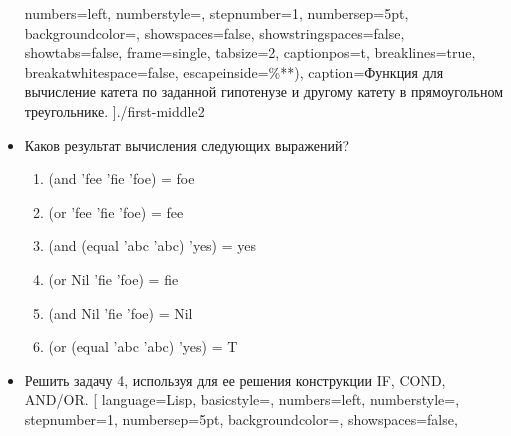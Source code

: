 \begin{itemize}
		numbers=left,               %
		numberstyle=\tiny,           %
		stepnumber=1,                   %
		numbersep=5pt,                %
		backgroundcolor=\color{white}, %
		showspaces=false,            %
		showstringspaces=false,      %
		showtabs=false,             %
		frame=single,              %
		tabsize=2,                 %
		captionpos=t,              %
		breaklines=true,           %
		breakatwhitespace=false, %
		escapeinside={\%*}{*)},  %
		caption=Функция для вычисление катета по заданной гипотенузе и другому катету в прямоугольном треугольнике.
		]{./first-middle2}
	\item Каков результат вычисления следующих выражений?
		\begin{enumerate}
			\item (and 'fee 'fie 'foe) = foe
			\item (or 'fee 'fie 'foe) = fee
			\item (and (equal 'abc 'abc) 'yes) = yes
			\item (or Nil 'fie 'foe) = fie
			\item (and Nil 'fie 'foe) = Nil
			\item (or (equal 'abc 'abc) 'yes) = T
		\end{enumerate}
	\item Решить задачу 4, используя для ее решения конструкции IF, COND, AND/OR.
		[
		language=Lisp,                 %
		basicstyle=\small\sffamily, %
		numbers=left,               %
		numberstyle=\tiny,           %
		stepnumber=1,                   %
		numbersep=5pt,                %
		backgroundcolor=\color{white}, %
		showspaces=false,            %

\end{itemize}
